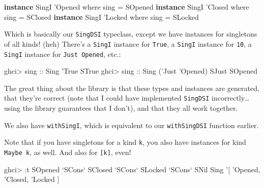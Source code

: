 \documentclass[]{article}
\newenvironment{Shaded}{}{}
\newcommand{\KeywordTok}[1]{\textcolor[rgb]{0.00,0.44,0.13}{\textbf{#1}}}
\newcommand{\DataTypeTok}[1]{\textcolor[rgb]{0.56,0.13,0.00}{#1}}
\newcommand{\CharTok}[1]{\textcolor[rgb]{0.25,0.44,0.63}{#1}}
\newcommand{\OtherTok}[1]{\textcolor[rgb]{0.00,0.44,0.13}{#1}}
\newcommand{\FunctionTok}[1]{\textcolor[rgb]{0.02,0.16,0.49}{#1}}
\newcommand{\NormalTok}[1]{#1}
\begin{document}
\begin{Shaded}
\begin{Highlighting}[]
\KeywordTok{instance} \DataTypeTok{SingI} \CharTok{'Opened where}
\NormalTok{    sing }\FunctionTok{=} \DataTypeTok{SOpened}
\KeywordTok{instance} \DataTypeTok{SingI} \CharTok{'Closed where}
\NormalTok{    sing }\FunctionTok{=} \DataTypeTok{SClosed}
\KeywordTok{instance} \DataTypeTok{SingI} \CharTok{'Locked where}
\NormalTok{    sing }\FunctionTok{=} \DataTypeTok{SLocked}
\end{Highlighting}
\end{Shaded}

Which is basically our \texttt{SingDSI} typeclass, except we have instances for
singletons of all kinds! (heh) There's a \texttt{SingI} instance for
\texttt{\textquotesingle{}True}, a \texttt{SingI} instance for \texttt{10}, a
\texttt{SingI} instance for
\texttt{\textquotesingle{}Just\ \textquotesingle{}Opened}, etc.:

\begin{Shaded}
\begin{Highlighting}[]
\NormalTok{ghci}\FunctionTok{>}\OtherTok{ sing ::} \DataTypeTok{Sing} \CharTok{'True}
\DataTypeTok{STrue}
\NormalTok{ghci}\FunctionTok{>}\OtherTok{ sing ::} \DataTypeTok{Sing}\NormalTok{ (}\CharTok{'Just '}\DataTypeTok{Opened}\NormalTok{)}
\DataTypeTok{SJust} \DataTypeTok{SOpened}
\end{Highlighting}
\end{Shaded}

The great thing about the library is that these types and instances are
generated, that they're correct (note that I could have implemented
\texttt{SingDSI} incorrectly\ldots{}using the library guarantees that I don't),
and that they all work together.

We also have \texttt{withSingI}, which is equivalent to our \texttt{withSingDSI}
function earlier.

Note that if you have singletons for a kind \texttt{k}, you also have instances
for kind \texttt{Maybe\ k}, as well. And also for \texttt{{[}k{]}}, even!

\begin{Shaded}
\begin{Highlighting}[]
\NormalTok{ghci}\FunctionTok{>} \FunctionTok{:}\NormalTok{t }\DataTypeTok{SOpened} \OtherTok{`SCons`} \DataTypeTok{SClosed} \OtherTok{`SCons`} \DataTypeTok{SLocked} \OtherTok{`SCons`} \DataTypeTok{SNil}
\DataTypeTok{Sing} \CharTok{'[ '}\DataTypeTok{Opened}\NormalTok{, }\CharTok{'Closed, '}\DataTypeTok{Locked}\NormalTok{ ]}
\end{Highlighting}
\end{Shaded}
\end{document}
